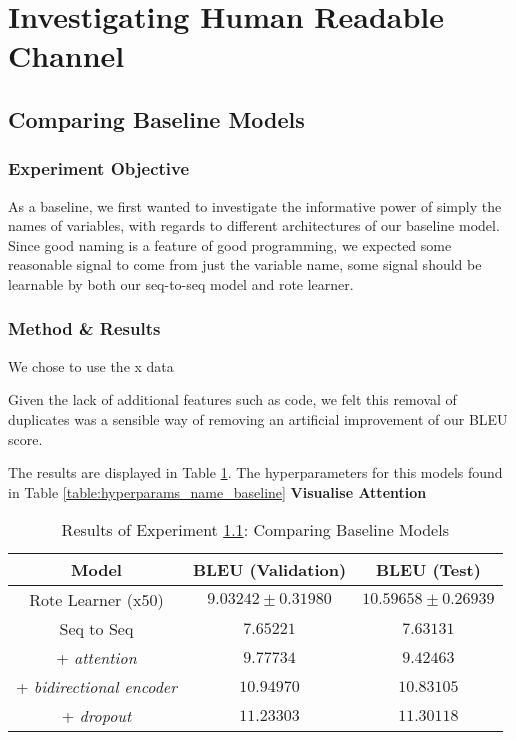 
\section{Investigating Human Readable Channel} %
\label{sec:investigating_human_readable_channel}

\subsection{Comparing Baseline Models} %
\label{sub:comparing_baseline_models}

\subsubsection{Experiment Objective} %

As a baseline, we first wanted to investigate the informative power of simply the names of variables, with regards to different architectures of our baseline model.
Since good naming is a feature of good programming, we expected some reasonable signal to come from just the variable name, some signal should be learnable by both our seq-to-seq model and rote learner.

\subsubsection{Method \& Results} %
We chose to use the x data

Given the lack of additional features such as code, we felt this removal of duplicates was a sensible way of removing an artificial improvement of our BLEU score. 

The results are displayed in Table \ref{table:name_baseline}. The hyperparameters for this models found in Table \ref{table:hyperparams_name_baseline}
\textbf{Visualise Attention}

\begin{table}[h!]
\begin{center}
\begin{tabular}{ c | c | c }
    Model                            & BLEU (Validation)  & BLEU (Test)    \\
    \hline
    Rote Learner (x50)                & $ 9.03242 \pm  0.31980 $ & $ 10.59658 \pm 0.26939 $   \\
    \hline
    Seq to Seq                        & $ 7.65221 $  & $ 7.63131  $ \\
    + \textit{attention}              & $ 9.77734 $  & $ 9.42463  $ \\
    + \textit{bidirectional encoder}  & $ 10.94970 $ & $ 10.83105 $ \\
    + \textit{dropout}                & $ 11.23303 $ & $ 11.30118 $ \\
    \hline
\end{tabular}
\caption {Results of Experiment \ref{sub:comparing_baseline_models}: Comparing Baseline Models }
\label{table:name_baseline}
\end{center}
\end{table}



